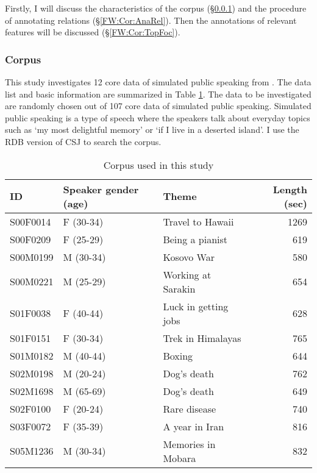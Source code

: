 Firstly, I will discuss the characteristics of the corpus (\S \ref{FW:Cor:Cor})
and the procedure of annotating  relations (\S \ref{FW:Cor:AnaRel}).
Then the annotations of relevant features will be discussed (\S \ref{FW:Cor:TopFoc}).

\subsubsection{Corpus}\label{FW:Cor:Cor}

This study investigates 12 core data of simulated public speaking 
from  \cite[CSJ:][]{maekawa03,maekawaetal04}.
The data list and basic information are summarized in Table \ref{CorpusInfoT}.
The data to be investigated are randomly chosen out of 107 core data of simulated public speaking.
Simulated public speaking is a type of speech
where the speakers talk about everyday topics
such as `my most delightful memory' or `if I live in a deserted island'.
I use the RDB version of CSJ \cite{koisoetal12} to search the corpus.

\begin{table}
	\begin{center}
	\caption{Corpus used in this study}
	\label{CorpusInfoT}
	\begin{tabular}{lllr}
	\toprule
	ID & Speaker gender (age) & Theme & Length (sec) \\
	\midrule
	S00F0014 & F (30-34) & Travel to Hawaii & 1269 \\
	S00F0209 & F (25-29) & Being a pianist & 619 \\
	S00M0199 & M (30-34) & Kosovo War & 580 \\
	S00M0221 & M (25-29) & Working at Sarakin & 654 \\
	S01F0038 & F (40-44) & Luck in getting jobs & 628 \\
	S01F0151 & F (30-34) & Trek in Himalayas & 765 \\
	S01M0182 & M (40-44) & Boxing & 644 \\
	S02M0198 & M (20-24) & Dog's death & 762 \\
	S02M1698 & M (65-69) & Dog's death & 649 \\
	S02F0100 & F (20-24) & Rare disease & 740 \\
	S03F0072 & F (35-39) & A year in Iran & 816 \\
	S05M1236 & M (30-34) & Memories in Mobara & 832 \\
	\bottomrule
	\end{tabular}
	\end{center}
\end{table}

